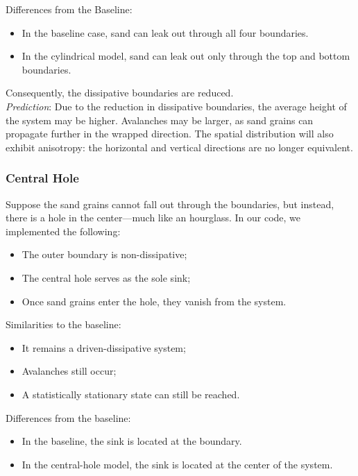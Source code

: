 \documentclass{article}
\begin{document}
Differences from the Baseline: 
\begin{itemize}
    \item In the baseline case, sand can leak out through all four boundaries.
    \item In the cylindrical model, sand can leak out only through the top and bottom boundaries.
\end{itemize}

Consequently, the dissipative boundaries are reduced.\\

\textit{Prediction}: Due to the reduction in dissipative boundaries, the average height of the system may be higher. Avalanches may be larger, as sand grains can propagate further in the wrapped direction. The spatial distribution will also exhibit anisotropy: the horizontal and vertical directions are no longer equivalent.

\subsubsection{Central Hole}
Suppose the sand grains cannot fall out through the boundaries, but instead, there is a hole in the center—much like an hourglass. In our code, we implemented the following:
\begin{itemize}
    \item The outer boundary is non-dissipative;
    \item The central hole serves as the sole sink;
    \item Once sand grains enter the hole, they vanish from the system.
\end{itemize}

Similarities to the baseline:
\begin{itemize}
    \item It remains a driven-dissipative system;
    \item Avalanches still occur;
    \item A statistically stationary state can still be reached.
\end{itemize}


Differences from the baseline:
\begin{itemize}
    \item In the baseline, the sink is located at the boundary.
    \item In the central-hole model, the sink is located at the center of the system.
\end{itemize}
\end{document}
